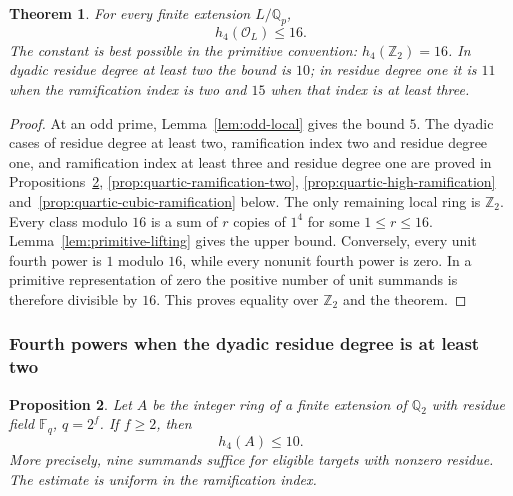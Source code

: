 \documentclass[11pt]{amsart}
\newtheorem{theorem}{Theorem}[section]
\newtheorem{proposition}[theorem]{Proposition}
\theoremstyle{definition}
\numberwithin{equation}{section}
\begin{document}
\begin{theorem}\label{thm:universal-quartic-sixteen}
For every finite extension $L/\mathbb Q_p$,
\[
 h_4(\mathcal O_L)\le16.
\]
The constant is best possible in the primitive convention:
$h_4(\mathbb Z_2)=16$.
In dyadic residue degree at least two the bound is $10$; in residue
degree one it is $11$ when the ramification index is two and $15$
when that index is at least three.
\end{theorem}
\begin{proof}
At an odd prime, Lemma~\ref{lem:odd-local} gives the bound $5$.
The dyadic cases of residue degree at least two, ramification index
two and residue degree one, and ramification index at least three
and residue degree one are proved in
Propositions~\ref{prop:quartic-residue-degree}, \ref{prop:quartic-ramification-two}, \ref{prop:quartic-high-ramification} and~\ref{prop:quartic-cubic-ramification} below.
The only remaining local ring is $\mathbb Z_2$. Every class modulo
$16$ is a sum of $r$ copies of $1^4$ for some $1\le r\le16$.
Lemma~\ref{lem:primitive-lifting} gives the upper bound. Conversely,
every unit fourth power is $1$ modulo $16$, while every nonunit
fourth power is zero. In a primitive representation of zero the
positive number of unit summands is therefore divisible by $16$.
This proves equality over $\mathbb Z_2$ and the theorem.
\end{proof}

\subsubsection{Fourth powers when the dyadic residue degree is at least two}
\label{sec:quartic-residue-degree}

\begin{proposition}
\label{prop:quartic-residue-degree}
Let $A$ be the integer ring of a finite extension of $\mathbb Q_2$ with
residue field $\mathbb F_q$, $q=2^f$. If $f\ge2$, then
\[
 h_4(A)\le10.
\]
More precisely, nine summands suffice for eligible targets with nonzero
residue. The estimate is uniform in the ramification index.
\end{proposition}
\end{document}
